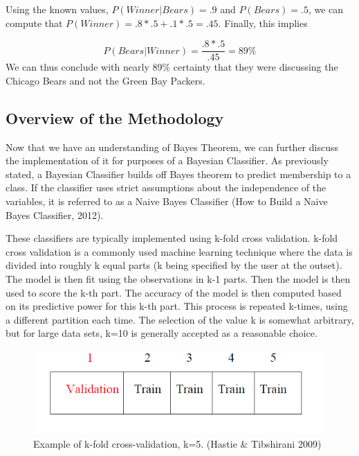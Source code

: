 \begin{flushleft}Using the known values, \begin{math}P(Winner|Bears)=.9\end{math} and \begin{math}P(Bears)=.5\end{math}, we can compute that \begin{math}P(Winner)=.8*.5+.1*.5=.45\end{math}. Finally, this implies
\end{flushleft}
\begin{equation}
P(Bears|Winner)=\frac{.8*.5}{.45}=89\%
\end{equation}
We can thus conclude with nearly 89\% certainty that they were discussing the Chicago Bears and not the Green Bay Packers.



\subsection{Overview of the Methodology} %

\begin{flushleft}
Now that we have an understanding of Bayes Theorem, we can further discuss the implementation of it for purposes of a Bayesian Classifier. As previously stated, a Bayesian Classifier builds off Bayes theorem to predict membership to a class. If the classifier uses strict assumptions about the independence of the variables, it is referred to as a Naive Bayes Classifier (How to Build a Naive Bayes Classifier, 2012). 
\end{flushleft}
These classifiers are typically implemented using k-fold cross validation. k-fold cross validation is a commonly used machine learning technique where the data is divided into roughly k equal parts (k being specified by the user at the outset). The model is then fit using the observations in k-1 parts. Then the model is then used to score the k-th part. The accuracy of the model is then computed based on its predictive power for this k-th part. This process is repeated k-times, using a different partition each time. The selection of the value k is somewhat arbitrary, but for large data sets, k=10 is generally accepted as a reasonable choice. 

\begin{figure}[H]
    \centering
       \includegraphics[width=4.5 in]{k-fold_cv.PNG}
    \caption{Example of k-fold cross-validation, k=5. (Hastie \& Tibshirani 2009)}
    \label{Example Data}
\end{figure}


